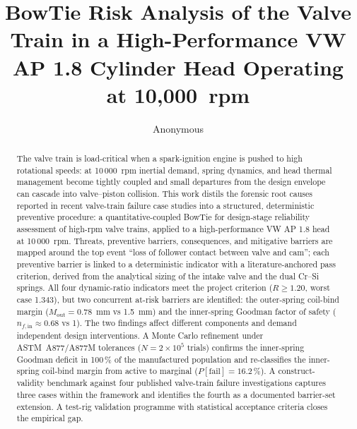 \documentclass[a4paper,fleqn]{cas-dc}
\begin{document}
\let\WriteBookmarks\relax
\def\floatpagepagefraction{1}
\def\textpagefraction{.001}



\title[mode=title]{BowTie Risk Analysis of the Valve Train in a High-Performance VW AP 1.8 Cylinder Head Operating at 10,000~rpm}

\author[1]{Anonymous}


\begin{abstract}
The valve train is load-critical when a spark-ignition engine is pushed to high rotational speeds: at 10\,000~rpm inertial demand, spring dynamics, and head thermal management become tightly coupled and small departures from the design envelope can cascade into valve--piston collision. This work distils the forensic root causes reported in recent valve-train failure case studies into a structured, deterministic preventive procedure: a quantitative-coupled BowTie for design-stage reliability assessment of high-rpm valve trains, applied to a high-performance VW AP 1.8 head at 10\,000~rpm. Threats, preventive barriers, consequences, and mitigative barriers are mapped around the top event ``loss of follower contact between valve and cam''; each preventive barrier is linked to a deterministic indicator with a literature-anchored pass criterion, derived from the analytical sizing of the intake valve and the dual Cr--Si springs. All four dynamic-ratio indicators meet the project criterion ($R\geq 1.20$, worst case 1.343), but two concurrent at-risk barriers are identified: the outer-spring coil-bind margin ($M_{\mathrm{out}}=0.78$~mm vs 1.5~mm) and the inner-spring Goodman factor of safety ($n_{f,\mathrm{in}}\approx 0.68$ vs 1). The two findings affect different components and demand independent design interventions. A Monte Carlo refinement under ASTM~A877/A877M tolerances ($N=2\times 10^{5}$ trials) confirms the inner-spring Goodman deficit in 100\,\% of the manufactured population and re-classifies the inner-spring coil-bind margin from active to marginal ($P[\mathrm{fail}]=16.2\,\%$). A construct-validity benchmark against four published valve-train failure investigations captures three cases within the framework and identifies the fourth as a documented barrier-set extension. A test-rig validation programme with statistical acceptance criteria closes the empirical gap.
\end{abstract}
\end{document}
